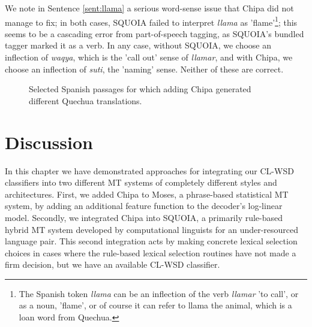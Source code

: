 We note in Sentence \ref{sent:llama} a serious word-sense issue that Chipa did
not manage to fix; in both cases, SQUOIA failed to interpret \emph{llama} as
'flame'\footnote{The Spanish token \emph{llama} can be an inflection of the
verb \emph{llamar} 'to call', or as a noun, 'flame', or of course it can refer
to llama the animal, which is a loan word from Quechua.}; this seems to be a
cascading error from part-of-speech tagging, as SQUOIA's bundled tagger marked
it as a verb. In any case, without SQUOIA, we choose an inflection of
\emph{waqya}, which is the 'call out' sense of \emph{llamar}, and with Chipa,
we choose an inflection of \emph{suti}, the 'naming' sense. Neither of these
are correct.

\begin{figure}
\label{sent:putyourhand}

\label{sent:alreadydead}

\label{sent:burning}

\label{sent:reins}

\label{sent:llama}
  \caption{Selected Spanish passages for which adding Chipa generated different
  Quechua translations.}
  \label{fig:some-spanish-verses-with-changes}
\end{figure}

\section{Discussion}
In this chapter we have demonstrated approaches for integrating our CL-WSD
classifiers into two different MT systems of completely different styles and
architectures. First, we added Chipa to Moses, a phrase-based statistical MT
system, by adding an additional feature function to the decoder's log-linear
model. Secondly, we integrated Chipa into SQUOIA, a primarily rule-based hybrid
MT system developed by computational linguists for an under-resourced language
pair. This second integration acts by making concrete lexical selection choices
in cases where the rule-based lexical selection routines have not made a firm
decision, but we have an available CL-WSD classifier.

